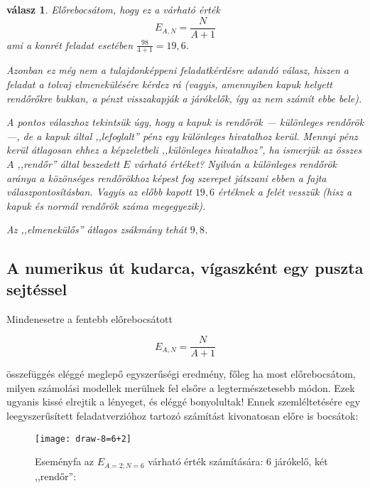 \documentclass{article}
\newtheorem{answer}{válasz}
\begin{document}
	\begin{answer}
		Előrebocsátom, hogy ez a várható érték
		\[
			E_{A,N} = \frac N{A+1}
		\]
		ami a konrét feladat esetében $\frac{98}{4+1} = 19,6$.

		Azonban ez még nem a tulajdonképpeni feladatkérdésre adandó válasz, hiszen a feladat a tolvaj elmenekülésére kérdez rá (vagyis, amennyiben kapuk helyett rendőrőkre bukkan, a pénzt visszakapják a járókelők, így az nem számít ebbe bele).

		A pontos válaszhoz tekintsük úgy, hogy a kapuk is rendőrök --- különleges rendőrök ---, de a kapuk által ,,lefoglalt'' pénz egy különleges hivatalhoz kerül. Mennyi pénz kerül átlagosan ehhez a képzeletbeli ,,különleges hivatalhoz'', ha ismerjük az összes $A$ ,,rendőr'' által beszedett $E$ várható értéket? Nyilván a különleges rendőrök aránya a közönséges rendőrökhoz képest fog szerepet játszani ebben a fajta válaszpontosításban. Vagyis az előbb kapott $19,6$ értéknek a felét vesszük (hisz a kapuk és normál rendőrök száma megegyezik).

		Az ,,elmenekülős'' átlagos zsákmány tehát $9,8$. 
	\end{answer}

	\subsection{A numerikus út kudarca, vígaszként egy puszta sejtéssel}

	Mindenesetre a fentebb előrebocsátott

	\[
		E_{A,N} = \frac N{A+1}
	\]

	összefüggés eléggé meglepő egyszerűségi eredmény, főleg ha most előrebocsátom, milyen számolási modellek merülnek fel elsőre a legtermészetesebb módon.
	Ezek ugyanis kissé elrejtik a lényeget, és eléggé bonyolultak!
	Ennek szemléltetésére egy leegyszerűsített feladatverzióhoz tartozó számítást kivonatosan előre is bocsátok:

	\begin{figure}[H]
		\caption*{Eseményfa az $E_{A=2;N=6}$ várható érték számítására: 6 járókelő, két ,,rendőr'':}
		\centering
		\texttt{[image: draw-8=6+2]}
	\end{figure}
\end{document}
